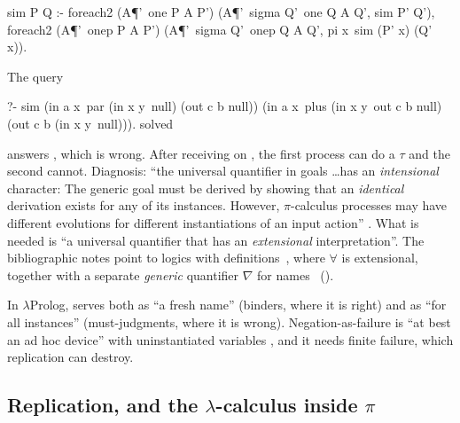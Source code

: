 {{\begin{lprolog}
sim P Q :- foreach2 (A\P'\ one P A P')
                    (A\P'\ sigma Q'\ one Q A Q', sim P' Q'),
           foreach2 (A\P'\ onep P A P')
                    (A\P'\ sigma Q'\ onep Q A Q',
                           pi x\ sim (P' x) (Q' x)).
\end{lprolog}
\noindent The query
\begin{lprolog}
?- sim (in a x\ par (in x y\ null) (out c b null))
       (in a x\ plus (in x y\ out c b null) (out c b (in x y\ null))).
solved
\end{lprolog}
\noindent answers , which is wrong. After receiving  on , the first
process can do a $\tau$ and the second cannot. Diagnosis: ``the universal quantifier in goals \ldots has an
\emph{intensional} character: The generic goal must be derived by showing that an \emph{identical}
derivation exists for any of its instances. However, $\pi$-calculus processes may have different evolutions
for different instantiations of an input action'' . What is needed is ``a universal quantifier that
has an \emph{extensional} interpretation''. The bibliographic notes point to logics with
definitions~\cite{McDowellMiller2000}, where $\forall$ is extensional, together with a separate
\emph{generic} quantifier $\nabla$ for names~\cite{MillerTiu2005} ().

\begin{pitfall}
In $\lambda$Prolog,  serves both as ``a fresh name'' (binders, where it is right) and as ``for all
instances'' (must-judgments, where it is wrong). Negation-as-failure is ``at best an ad hoc device'' with
uninstantiated variables , and it needs finite failure, which replication can destroy.
\end{pitfall}

\subsection{Replication, and the \texorpdfstring{$\lambda$}{lambda}-calculus inside \texorpdfstring{$\pi$}{pi}}\label{sec:apps-lampi}

}}
